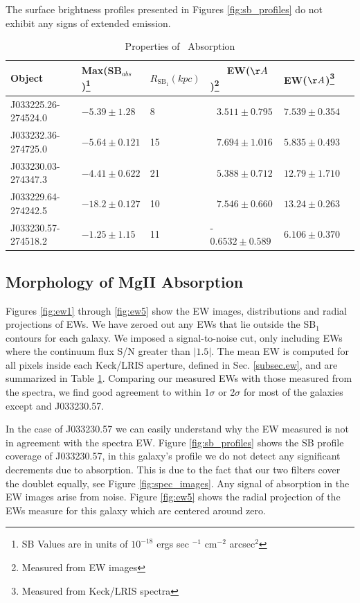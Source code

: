 \documentclass[twocolumn]{aastex61}
\begin{document}
The surface brightness profiles presented in Figures \ref{fig:sb_profiles} do not exhibit any signs of extended  emission. \\

\begin{table}[]
\centering
\caption{Properties of \ Absorption\label{tab:abs_props}}  
\begin{tabular}{llllll} \hline \hline
Object & Max(SB$_{abs}$)\footnote{SB Values are in units of $10^{-18}$ ergs sec $^{-1}$ cm$^{-2}$ arcsec$^2$} & $R_{\text{SB}_1}(kpc)$ &\ \ \ EW($\AA$)\footnote{ Measured from EW images} & EW($\AA$)\footnote{Measured from Keck/LRIS spectra}  \\  \hline
J033225.26-274524.0 &  $-5.39 \pm 1.28 $ & 8 &     $\ \ \ 3.511 \pm 0.795$ & $7.539 \pm 0.354 $\\
J033232.36-274725.0 &  $-5.64 \pm 0.121 $ & 15 & $\ \ \ 7.694 \pm 1.016$ & $5.835 \pm 0.493$\\
J033230.03-274347.3 &  $-4.41 \pm 0.622 $ & 21 & $\ \ \ 5.388 \pm 0.712$ & $12.79 \pm 1.710$\\
J033229.64-274242.5 &  $-18.2 \pm 0.127 $ & 10 & $\ \ \ 7.546 \pm 0.660$ & $13.24 \pm 0.263$\\
J033230.57-274518.2 &  $-1.25 \pm 1.15   $ & 11& -$0.6532 \pm 0.589$ & $6.106 \pm 0.370$\\ \hline
\end{tabular}
\end{table}
\subsection{Morphology of MgII Absorption}

Figures \ref{fig:ew1} through \ref{fig:ew5} show the EW images, distributions and radial projections of  EWs. We have zeroed out any EWs that lie outside the SB$_1$ contours for each galaxy. We imposed a signal-to-noise cut, only including EWs where the continuum flux S/N greater than $|1.5|$. The mean EW is computed for all pixels inside each Keck/LRIS aperture, defined in Sec. \ref{subsec.ew}, and are summarized in Table \ref{tab:abs_props}. Comparing our measured EWs with those measured from the spectra, we find good agreement to within 1$\sigma$ or 2$\sigma$ for most of the galaxies except and J033230.57.

In the case of J033230.57 we can easily understand why the EW measured is not in agreement with the spectra EW. Figure \ref{fig:sb_profiles}  shows the SB profile coverage of J033230.57, in this galaxy's profile we do not detect any significant decrements due to absorption. This is due to the fact that our two filters cover the  doublet equally, see Figure  \ref{fig:spec_images}. Any signal of absorption in the EW images arise from noise. Figure \ref{fig:ew5} shows the radial projection of the EWs measure for this galaxy which are centered around zero.
\end{document}
